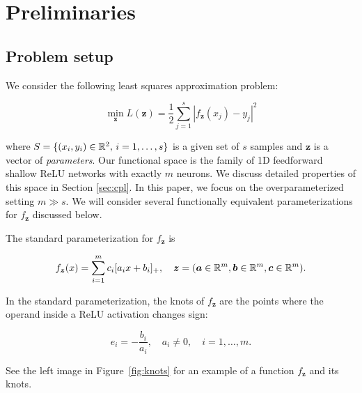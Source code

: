 \section{Preliminaries}







\subsection{Problem setup}


We consider the following least squares approximation problem:

\begin{equation}\label{eq:leastsquares}
    \min_{\bm z} L(\bm z) =  \frac{1}{2} \sum_{j=1}^s |f_{\bm z}(x_j) - y_j|^2
\end{equation}

where $S = \{ (x_i, y_i) \in \mathbb{R}^2, \, i =1,\ldots, s\}$ is a given set of $s$ samples and $\bm z$ is a vector of \emph{parameters}. Our functional space is the family of 1D feedforward shallow ReLU networks with exactly $m$ neurons. We discuss detailed properties of this space in Section \ref{sec:cpl}. In this paper, we focus on the overparameterized setting $m \gg s$. We will consider several functionally equivalent parameterizations for $f_{\bm z}$ discussed below.

The standard parameterization for $f_{\bm z}$ is

\begin{equation}\label{eq:standard_parameterization}
    f_{\bm z}(x) = \sum_{i=1}^m c_i [a_i x + b_i]_+, \quad \bm z = (\bm a \in \mathbb{R}^m, \bm b \in \mathbb{R}^m, \bm c \in \mathbb{R}^m).
\end{equation}

In the standard parameterization, the knots of $f_{\bm z}$ are the points where the operand inside a ReLU activation changes sign:

\begin{equation}\label{eq:knots}
e_i = -\frac{b_i}{a_i}, \quad a_i \ne 0, \quad i=1,\ldots,m.
\end{equation}

See the left image in Figure~\ref{fig:knots} for an example of a function $f_{\bm z}$ and its knots. 


